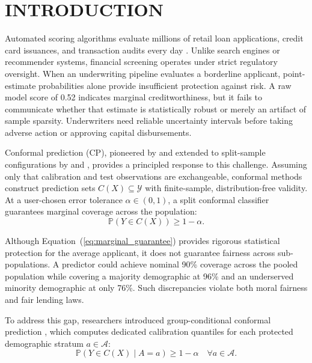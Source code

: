 \documentclass[twoside]{article}
\begin{document}
\section{INTRODUCTION}

Automated scoring algorithms evaluate millions of retail loan applications, credit card issuances, and transaction audits every day \citep{barocas2023fairness}. Unlike search engines or recommender systems, financial screening operates under strict regulatory oversight. When an underwriting pipeline evaluates a borderline applicant, point-estimate probabilities alone provide insufficient protection against risk. A raw model score of 0.52 indicates marginal creditworthiness, but it fails to communicate whether that estimate is statistically robust or merely an artifact of sample sparsity. Underwriters need reliable uncertainty intervals before taking adverse action or approving capital disbursements.

Conformal prediction (CP), pioneered by \citet{vovk2005algorithmic} and extended to split-sample configurations by \citet{lei2018distribution} and \citet{romano2020classification}, provides a principled response to this challenge. Assuming only that calibration and test observations are exchangeable, conformal methods construct prediction sets $C(X) \subseteq \mathcal{Y}$ with finite-sample, distribution-free validity. At a user-chosen error tolerance $\alpha \in (0, 1)$, a split conformal classifier guarantees marginal coverage across the population:
\begin{equation}
\label{eq:marginal_guarantee}
\mathbb{P}\left(Y \in C(X)\right) \ge 1 - \alpha.
\end{equation}

Although Equation~(\ref{eq:marginal_guarantee}) provides rigorous statistical protection for the average applicant, it does not guarantee fairness across sub-populations. A predictor could achieve nominal 90\% coverage across the pooled population while covering a majority demographic at 96\% and an underserved minority demographic at only 76\%. Such discrepancies violate both moral fairness and fair lending laws.

To address this gap, researchers introduced group-conditional conformal prediction \citep{romano2020classification}, which computes dedicated calibration quantiles for each protected demographic stratum $a \in \mathcal{A}$:
\begin{equation}
\label{eq:group_guarantee}
\mathbb{P}\left(Y \in C(X) \mid A = a\right) \ge 1 - \alpha \quad \forall a \in \mathcal{A}.
\end{equation}
\end{document}
